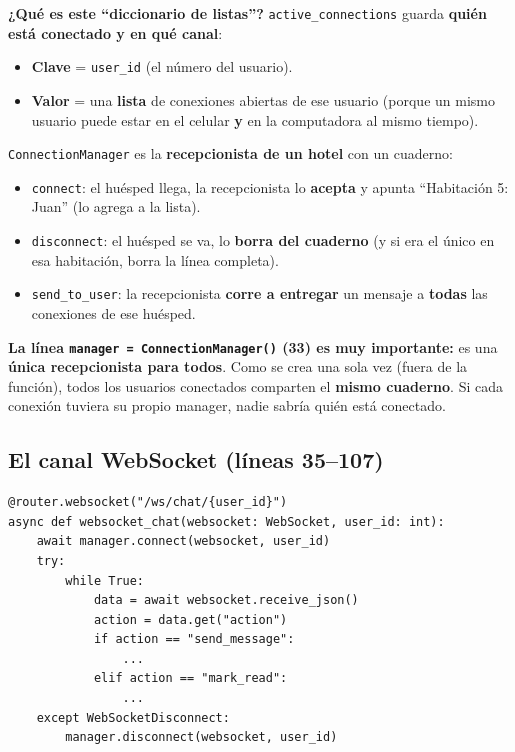 \documentclass[11pt,a4paper]{article}
\begin{document}
\textbf{¿Qué es este ``diccionario de listas''?}
\texttt{active\_connections} guarda \textbf{quién está conectado y en qué canal}:
\begin{itemize}
    \item \textbf{Clave} = \texttt{user\_id} (el número del usuario).
    \item \textbf{Valor} = una \textbf{lista} de conexiones abiertas de ese usuario (porque un
    mismo usuario puede estar en el celular \textbf{y} en la computadora al mismo tiempo).
\end{itemize}

\begin{analogia}
\texttt{ConnectionManager} es la \textbf{recepcionista de un hotel} con un cuaderno:
\begin{itemize}
    \item \texttt{connect}: el huésped llega, la recepcionista lo \textbf{acepta} y apunta
    ``Habitación 5: Juan'' (lo agrega a la lista).
    \item \texttt{disconnect}: el huésped se va, lo \textbf{borra del cuaderno} (y si era el
    único en esa habitación, borra la línea completa).
    \item \texttt{send\_to\_user}: la recepcionista \textbf{corre a entregar} un mensaje a
    \textbf{todas} las conexiones de ese huésped.
\end{itemize}
\end{analogia}

\textbf{La línea \texttt{manager = ConnectionManager()} (33) es muy importante:} es una
\textbf{única recepcionista para todos}. Como se crea una sola vez (fuera de la función), todos
los usuarios conectados comparten el \textbf{mismo cuaderno}. Si cada conexión tuviera su
propio manager, nadie sabría quién está conectado.

\subsection{El canal WebSocket (líneas 35--107)}

\begin{lstlisting}
@router.websocket("/ws/chat/{user_id}")
async def websocket_chat(websocket: WebSocket, user_id: int):
    await manager.connect(websocket, user_id)
    try:
        while True:
            data = await websocket.receive_json()
            action = data.get("action")
            if action == "send_message":
                ...
            elif action == "mark_read":
                ...
    except WebSocketDisconnect:
        manager.disconnect(websocket, user_id)
\end{lstlisting}
\end{document}
